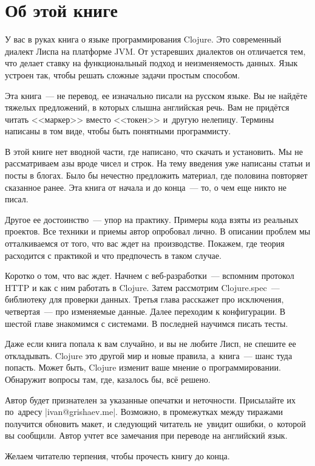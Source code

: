 \chapter*{Об этой книге}

У вас в руках книга о языке программирования Clojure. Это современный диалект
Лиспа на платформе JVM. От устаревших диалектов он отличается тем, что делает
ставку на функциональный подход и неизменяемость данных. Язык устроен так, чтобы
решать сложные задачи простым способом.

Эта книга~--- не перевод, ее изначально писали на русском языке. Вы не найд\"{е}те
тяжелых предложений, в которых слышна английская речь. Вам не прид\"{е}тся читать
<<маркер>> вместо <<токен>> и~другую нелепицу. Термины написаны в том виде,
чтобы быть понятными программисту.

В этой книге нет вводной части, где написано, что скачать и установить. Мы не
рассматриваем азы вроде чисел и строк. На тему введения уже написаны статьи и
посты в блогах. Было бы нечестно предложить материал, где половина повторяет
сказанное ранее. Эта книга от начала и до конца~--- то, о чем еще никто не
писал.

Другое ее достоинство~--- упор на практику. Примеры кода взяты из реальных
проектов. Все техники и приемы автор опробовал лично. В описании проблем мы
отталкиваемся от того, что вас ждет на~производстве. Покажем, где теория
расходится с практикой и что предпочесть в таком случае.

Коротко о том, что вас ждет. Начнем с веб-разработки~--- вспомним протокол HTTP
и как с ним работать в Clojure. Затем рассмотрим Clojure.spec~--- библиотеку для
проверки данных. Третья глава расскажет про исключения, четвертая~--- про
изменяемые данные. Далее переходим к конфигурации. В шестой главе знакомимся с
системами. В последней научимся писать тесты.

Даже если книга попала к вам случайно, и вы не любите Лисп, не спешите ее
откладывать. Clojure это другой мир и новые правила, а~книга~--- шанс туда
попасть. Может быть, Clojure изменит ваше мнение о программировании. Обнаружит
вопросы там, где, казалось бы, вс\"{е} решено.

Автор будет признателен за указанные опечатки и неточности. Присылайте их
по~адресу \spverb|ivan@grishaev.me|. Возможно, в промежутках между тиражами
получится обновить макет, и следующий читатель не~увидит ошибки, о~которой вы
сообщили. Автор учтет все замечания при переводе на английский язык.

Желаем читателю терпения, чтобы прочесть книгу до конца.


